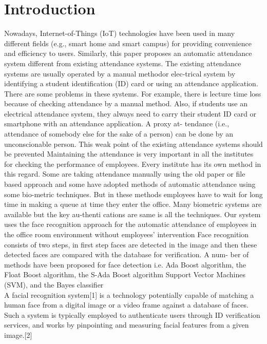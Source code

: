 \section{Introduction}
Nowadays, Internet-of-Things (IoT) technologies have been used in many different fields (e.g., smart home and smart
campus) for providing convenience and efficiency to users. Similarly, this paper proposes an automatic attendance system
different from existing attendance systems. The existing attendance systems are usually operated by a manual methodor
elec-trical system by identifying a student identification (ID) card or using an attendance application. There are some
problems in these systems.
For example, there is lecture time loss because of checking attendance by a manual method.
Also, if students use an electrical attendance system, they always need to carry their student ID card or smartphone with
an attendance application. A proxy at- tendance (i.e., attendance of somebody else for the sake of a person) can be done
by an unconscionable person. This weak point of the existing attendance systems should be prevented
Maintaining the attendance is very important in all the institutes for checking the performance of employees. Every
institute has its own method in this regard. Some are taking attendance manually using the old paper or file based approach
and some have adopted methods of automatic attendance using some bio-metric techniques.
But in these methods employees have to wait for long time in making a queue at time they enter the office. Many biometric systems are available but the key au-thenti cations are same is all the techniques.
Our system uses the face recognition approach for the automatic attendance of employees in the office room environment
without employees’ intervention Face recognition consists of two steps, in first step faces are detected in the image and
then these detected faces are compared with the database for verification. A num- ber of methods have been proposed for
face detection i.e. Ada Boost algorithm, the Float Boost algorithm, the S-Ada Boost algorithm Support Vector Machines
(SVM), and the Bayes classifier
\\
A facial recognition system[1] is a technology potentially capable of matching a human face from a digital image or a video frame against a database of faces. Such a system is typically employed to authenticate users through ID verification services, and works by pinpointing and measuring facial features from a given image.[2]

